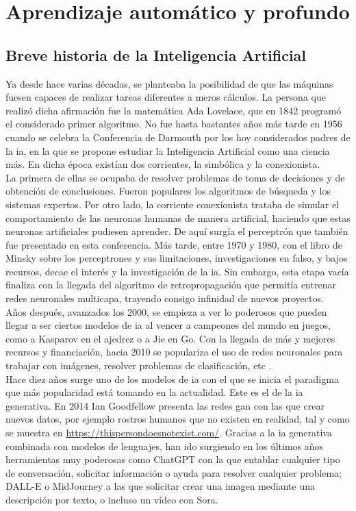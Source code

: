 \chapter{Aprendizaje automático y profundo}

	\section{Breve historia de la Inteligencia Artificial}
	
		Ya desde hace varias décadas, se planteaba la posibilidad de que las máquinas fuesen capaces de realizar tareas diferentes a meros cálculos. La persona que realizó dicha afirmación fue la matemática Ada Lovelace, que en 1842 programó el considerado primer algoritmo. No fue hasta bastantes años más tarde en 1956 cuando se celebra la Conferencia de Darmouth por los hoy considerados padres de la \gls{ia}, en la que se propone estudiar la Inteligencia Artificial como una ciencia más. En dicha época existían dos corrientes, la simbólica y la conexionista. \\
		
		La primera de ellas se ocupaba de resolver problemas de toma de decisiones y de obtención de conclusiones. Fueron populares los algoritmos de búsqueda y los sistemas expertos. Por otro lado, la corriente conexionista trataba de simular el comportamiento de las neuronas humanas de manera artificial, haciendo que estas neuronas artificiales pudiesen aprender. De aquí surgía el perceptrón que también fue presentado en esta conferencia. Más tarde, entre 1970 y 1980, con el libro de Minsky sobre los perceptrones y sus limitaciones, investigaciones en falso, y bajos recursos, decae el interés y la investigación de la \gls{ia}. Sin embargo, esta etapa vacía finaliza con la llegada del algoritmo de retropropagación que permitía entrenar redes neuronales multicapa, trayendo consigo infinidad de nuevos proyectos. \\
		
		Años después, avanzados los 2000, se empieza a ver lo poderosos que pueden llegar a ser ciertos modelos de \gls{ia} al vencer a campeones del mundo en juegos, como a Kasparov en el ajedrez o a Jie en Go. Con la llegada de más y mejores recursos y financiación, hacia 2010 se populariza el uso de redes neuronales para trabajar con imágenes, resolver problemas de clasificación, etc \cite{historiaIA}. \\
		
		Hace diez años surge uno de los modelos de \gls{ia} con el que se inicia el paradigma que más popularidad está tomando en la actualidad. Este es el de la \gls{ia} generativa. En 2014 Ian Goodfellow presenta las redes \gls{gan} con las que crear nuevos datos, por ejemplo rostros humanos que no existen en realidad, tal y como se muestra en \url{https://thispersondoesnotexist.com/}. Gracias a la \gls{ia} generativa combinada con modelos de lenguajes, han ido surgiendo en los últimos años herramientas muy poderosas como ChatGPT con la que entablar cualquier tipo de conversación, solicitar información o ayuda para resolver cualquier problema; DALL-E o MidJourney a las que solicitar crear una imagen mediante una descripción por texto, o incluso un vídeo con Sora. 
	
